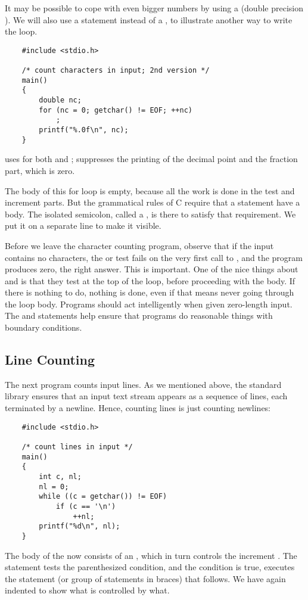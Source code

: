 It may be possible to cope with even bigger numbers by using a  (double precision ).
We will also use a  statement instead of a , to illustrate another way to write the loop.
\begin{lstlisting}
	#include <stdio.h>

	/* count characters in input; 2nd version */
	main()
	{
		double nc;
		for (nc = 0; getchar() != EOF; ++nc)
			;
		printf("%.0f\n", nc);
	}
\end{lstlisting}
 uses  for both  and ;  suppresses the printing of the decimal point and the fraction part, which is zero.

The body of this for loop is empty, because all the work is done in the test and increment parts.
But the grammatical rules of C require that a  statement have a body.
The isolated semicolon, called a , is there to satisfy that requirement.
We put it on a separate line to make it visible.

Before we leave the character counting program, observe that if the input contains no characters, the  or  test fails on the very first call to , and the program produces zero, the right answer.
This is important.
One of the nice things about  and  is that they test at the top of the loop, before proceeding with the body.
If there is nothing to do, nothing is done, even if that means never going through the loop body.
Programs should act intelligently when given zero-length input.
The  and  statements help ensure that programs do reasonable things with boundary conditions.



\subsection{Line Counting}


The next program counts input lines.
As we mentioned above, the standard library ensures that an input text stream appears as a sequence of lines, each terminated by a newline.
Hence, counting lines is just counting newlines:
\begin{lstlisting}
	#include <stdio.h>

	/* count lines in input */
	main()
	{
		int c, nl;
		nl = 0;
		while ((c = getchar()) != EOF)
			if (c == '\n')
				++nl;
		printf("%d\n", nl);
	}
\end{lstlisting}
The body of the  now consists of an , which in turn controls the increment .
The  statement tests the parenthesized condition, and  the condition is true, executes the statement (or group of statements in braces) that follows.
We have again indented to show what is controlled by what.

